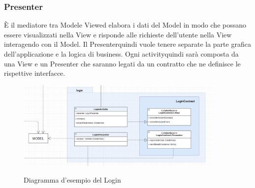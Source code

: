\subsubsection{Presenter}
È il mediatore tra Model\glosp e View\glosp ed elabora i dati del Model in modo che possano essere visualizzati nella View e risponde alle richieste dell'utente nella View interagendo con il Model. Il Presenter\glosp quindi vuole tenere separate la parte grafica dell'applicazione e la logica di business.\newline
Ogni activity\glosp quindi sarà composta da una View e un Presenter che saranno legati da un contratto che ne definisce le rispettive interfacce.
\begin{figure}[H]
	\centering
	\includegraphics[width=0.9\textwidth]
	{res/images/contratto.png}\\
	\caption{Diagramma d'esempio del Login}
	\label{Schema Login}
\end{figure}
\newpage
